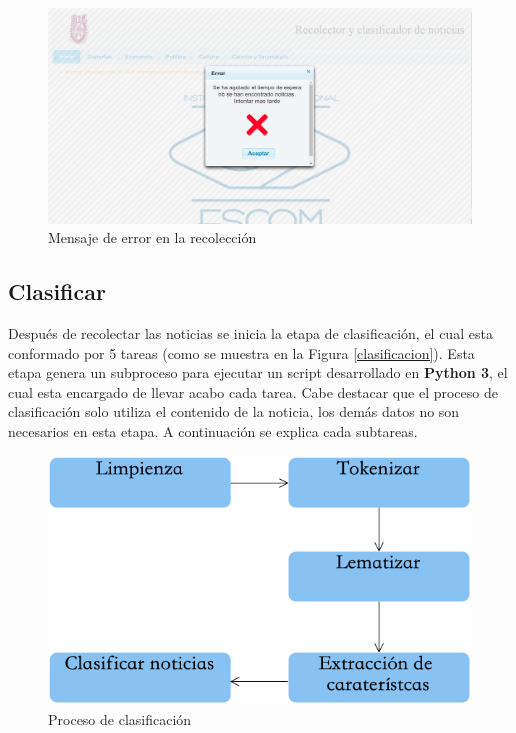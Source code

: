 \begin{figure}[H]
\centering
\includegraphics[scale=0.29]{imagenes/Capitulo5/errorConectividad.png}
\caption{Mensaje de error en la recolección}
\label{fig:notNoRec}
\end{figure}

\subsection{Clasificar}

Después de recolectar las noticias se inicia la etapa de clasificación, el cual esta conformado por 5 tareas (como se muestra en la Figura \ref{clasificacion}). Esta etapa genera un subproceso para ejecutar un script desarrollado en \textbf{Python 3}, el cual esta encargado de llevar acabo cada tarea. Cabe destacar que el proceso de clasificación solo utiliza el contenido de la noticia, los demás datos no son necesarios en esta etapa. A continuación se explica cada subtareas.

\begin{figure}[H]
\centering
\includegraphics[scale=0.55]{imagenes/Capitulo5/AplicacionWeb/PreprocesamientoWeb.png}
\caption{Proceso de clasificación}
\label{fig:cp5:clasificacion}
\end{figure}

